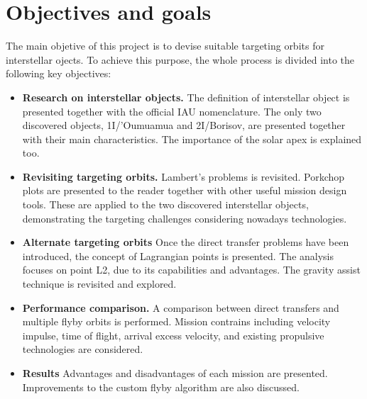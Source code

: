 \section{Objectives and goals}

The main objetive of this project is to devise suitable targeting orbits for
interstellar ojects. To achieve this purpose, the whole process is divided
into the following key objectives:

\begin{itemize}

  \item \textbf{Research on interstellar objects.}
        The definition of interstellar object is presented together with the
        official IAU nomenclature. The only two discovered objects,
        1I/'Oumuamua and 2I/Borisov, are presented together with their main
        characteristics. The importance of the solar apex is explained
        too.

  \item \textbf{Revisiting targeting orbits.}
        Lambert's problems is revisited. Porkchop plots are presented to the
        reader together with other useful mission design tools. These are
        applied to the two discovered interstellar objects, demonstrating the
        targeting challenges considering nowadays technologies.

  \item \textbf{Alternate targeting orbits}
        Once the direct transfer problems have been introduced, the concept of
        Lagrangian points is presented. The analysis focuses on point L2, due
        to its capabilities and advantages. The gravity assist technique is
        revisited and explored.

  \item \textbf{Performance comparison.}
        A comparison between direct transfers and multiple flyby orbits is
        performed. Mission contrains including velocity impulse, time of
        flight, arrival excess velocity, and existing propulsive technologies
        are considered.

  \item \textbf{Results}
        Advantages and disadvantages of each mission are presented. Improvements
        to the custom flyby algorithm are also discussed.
\end{itemize}
